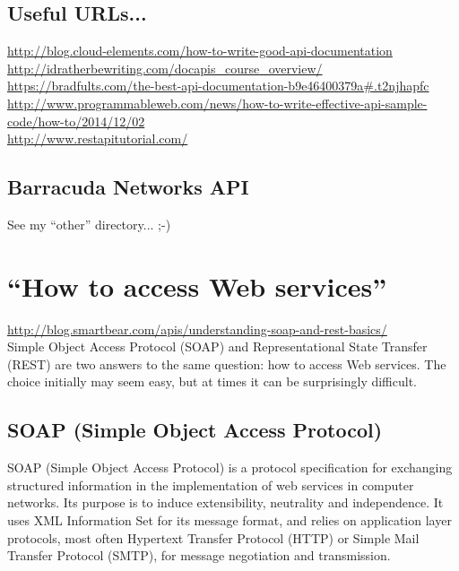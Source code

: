 \documentclass[11pt]{article}
\begin{document}
\subsection{Useful URLs...}
\href{http://blog.cloud-elements.com/how-to-write-good-api-documentation}{http://blog.cloud-elements.com/how-to-write-good-api-documentation}\\
\href{http://idratherbewriting.com/docapis_course_overview/}{http://idratherbewriting.com/docapis_course_overview/}\\
\href{https://bradfults.com/the-best-api-documentation-b9e46400379a#.b04jcz2ox}{https://bradfults.com/the-best-api-documentation-b9e46400379a#.t2njhapfc}\\
\href{http://www.programmableweb.com/news/how-to-write-effective-api-sample-code/how-to/2014/12/02}{http://www.programmableweb.com/news/how-to-write-effective-api-sample-code/how-to/2014/12/02}\\
\href{http://www.restapitutorial.com/}{http://www.restapitutorial.com/}\\

\subsection{Barracuda Networks API}
See my ``other'' directory... ;-)



\newpage
\section{``How to access Web services''}
\href{http://blog.smartbear.com/apis/understanding-soap-and-rest-basics/}{http://blog.smartbear.com/apis/understanding-soap-and-rest-basics/}\\
Simple Object Access Protocol (SOAP) and Representational State Transfer (REST) are two answers to the same question: how to access Web services. The choice initially may seem easy, but at times it can be surprisingly difficult.

\subsection{SOAP (Simple Object Access Protocol)} 
SOAP (Simple Object Access Protocol) is a protocol specification for
exchanging structured information in the implementation of web
services in computer networks. Its purpose is to induce extensibility,
neutrality and independence. It uses XML Information Set for its
message format, and relies on application layer protocols, most often
Hypertext Transfer Protocol (HTTP) or Simple Mail Transfer Protocol
(SMTP), for message negotiation and transmission.
\end{document}
